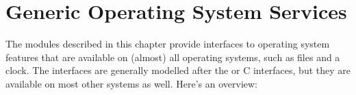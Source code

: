 \chapter{Generic Operating System Services \label{allos}}

The modules described in this chapter provide interfaces to operating
system features that are available on (almost) all operating systems,
such as files and a clock.  The interfaces are generally modelled
after the \UNIX{} or C interfaces, but they are available on most
other systems as well.  Here's an overview:

\localmoduletable

